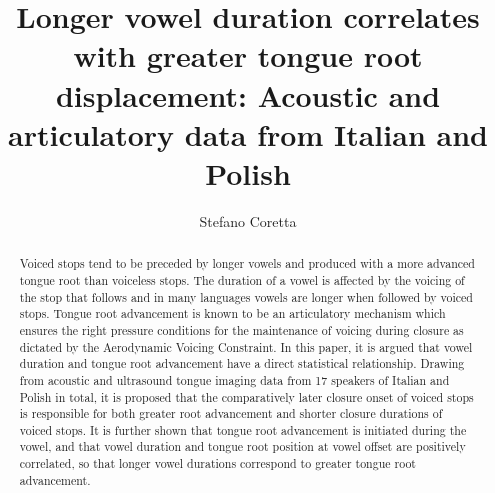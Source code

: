 \documentclass[preprint]{JASAnew}
\begin{document}

\title[]{Longer vowel duration correlates with greater tongue root displacement:
Acoustic and articulatory data from Italian and Polish}



\author{Stefano Coretta}






\begin{abstract}
Voiced stops tend to be preceded by longer vowels and produced with a
more advanced tongue root than voiceless stops. The duration of a vowel
is affected by the voicing of the stop that follows and in many
languages vowels are longer when followed by voiced stops. Tongue root
advancement is known to be an articulatory mechanism which ensures the
right pressure conditions for the maintenance of voicing during closure
as dictated by the Aerodynamic Voicing Constraint. In this paper, it is
argued that vowel duration and tongue root advancement have a direct
statistical relationship. Drawing from acoustic and ultrasound tongue
imaging data from 17 speakers of Italian and Polish in total, it is
proposed that the comparatively later closure onset of voiced stops is
responsible for both greater root advancement and shorter closure
durations of voiced stops. It is further shown that tongue root
advancement is initiated during the vowel, and that vowel duration and
tongue root position at vowel offset are positively correlated, so that
longer vowel durations correspond to greater tongue root advancement.
\end{abstract}
\end{document}
